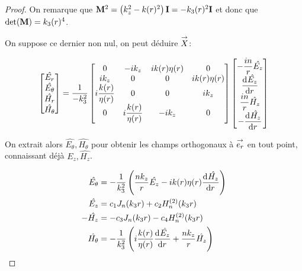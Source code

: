 \begin{proof}
      On remarque que \(\mM^2 = \left(k_z^2 - k(r)^2\right)\mI=-k_3(r)^2\mI\) et donc que \(\det(\mat{M}) = k_3(r)^4\).


      On suppose ce dernier non nul, on peut déduire \(\vect{X}\):

      \begin{equation*}
        \begin{bmatrix}
          \hat{E_r}\\
          \hat{E_\theta}\\
          \hat{H_r}\\
          \hat{H_\theta}
        \end{bmatrix} =
        \frac{1}{-k_3^2}
        \begin{bmatrix}
        0 & -ik_z & ik(r)\eta(r) & 0
        \\
        ik_z & 0 & 0 & ik(r)\eta(r)
        \\
        i\frac{k(r)}{\eta(r)} & 0 & 0 & ik_z
        \\
        0 & i\frac{k(r)}{\eta(r)} & -ik_z & 0
        \end{bmatrix}
        \begin{bmatrix}
          -\frac{in}{r}\hat{E_z}\\
          \ddp{r}{\hat{E_z}}\\
          \frac{in}{r}\hat{H_z}\\
          -\ddp{r}{\hat{H_z}}
        \end{bmatrix}
      \end{equation*}

      On extrait alors \(\hat{E_\theta}, \hat{H_\theta}\) pour obtenir les champs orthogonaux à \(\vect{e_r}\) en tout point, connaissant déjà \(\hat{E_z}, \hat{H_z}\).

      \begin{align*}
        \hat{E_\theta} &= -\frac{1}{k_3^2}\left(\frac{nk_z}{r}\hat{E_z} - ik(r)\eta(r)\ddp{r}{\hat{H_z}}\right)
        \\
        \hat{E_z} &= c_1 J_n(k_3 r) + c_2 H_n^{(2)}(k_3 r)
        \\
        -\hat{H_z} &= -c_3 J_n(k_3 r) - c_4 H_n^{(2)}(k_3 r)
        \\
        \hat{H_\theta} &= -\frac{1}{k_3^2}\left(i\frac{k(r)}{\eta(r)}\ddp{r}{\hat{E_z}} + \frac{nk_z}{r}\hat{H_z}\right)
      \end{align*}


\end{proof}
